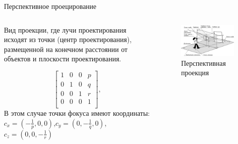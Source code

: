 \documentclass{beamer}
\begin{document}
	\begin{frame}{Перспективное проецирование}

		\begin{columns}
			\begin{column}{0.45\textwidth}
				Вид проекции, где лучи проектирования исходят из точки (центр проектирования), размещенной на конечном расстоянии от объектов и плоскости проектирования.
	
				\[
					\begin{bmatrix}
						1 & 0 & 0 & p \\
						0 & 1 & 0 & q \\
						0 & 0 & 1 & r \\
						0 & 0 & 0 & 1 \\
					\end{bmatrix}	
					,
				\]
					В этом случае точки фокуса имеют координаты:
					$c_x = (- \frac{1}{p},0,0)$,$c_y = (0,- \frac{1}{q},0)$, $c_z =(0,0, - \frac{1}{r})$
		\end{column}
		\begin{column}{0.55\textwidth}
			\begin{figure} 
					\includegraphics[width=\textwidth]{images/perspective_projections.png}
				\caption{Перспективная проекция}
			\end{figure}
		\end{column}
	\end{columns}


\end{frame}
\end{document}

